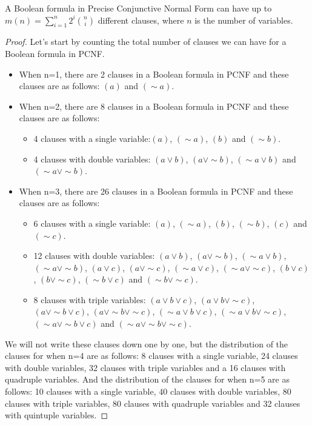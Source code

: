 \documentclass[runningheads,a4paper]{llncs}
\let\oldsim\sim
\renewcommand{\sim}{{\oldsim}}
\begin{document}
\begin{theorem}\normalfont

A Boolean formula in Precise Conjunctive Normal Form can have up to $ m(n) = \sum_{i=1}^{n} 2^{i} \binom{n} {i}$ different clauses, where $n$ is the number of variables.
\begin{proof} Let's start by counting the total number of clauses we can have for a Boolean formula in PCNF.
\begin{itemize}
\item When n=1, there are 2 clauses in a Boolean formula in PCNF and these clauses are as follows: $(a)$ and $(\sim a)$.
 
\item When n=2, there are 8 clauses in a Boolean formula in PCNF and these clauses are as follows:
     \begin{itemize}
    \item 4 clauses with a single variable:$(a)$, $(\sim a)$, $(b)$ and $(\sim b)$.
   \item 4 clauses with double variables: $({a}\vee {b})$, $({a}\vee \sim {b})$, $(\sim {a}\vee {b})$ and $(\sim {a}\vee \sim {b})$.
     \end{itemize}
\item When n=3, there are 26 clauses in a Boolean formula in PCNF and these clauses are as follows:
    \begin{itemize}
    \item 6 clauses with a single variable: $(a)$, $(\sim a)$, $(b)$, $(\sim b)$, $(c)$ and $(\sim c)$.
    \item 12 clauses with double variables: $({a}\vee {b})$, $({a}\vee \sim {b})$, $(\sim {a}\vee {b})$,  $(\sim {a}\vee \sim {b})$, $({a}\vee {c})$, $({a}\vee \sim {c})$, $(\sim {a}\vee {c})$,  $(\sim {a}\vee \sim {c})$, $({b}\vee {c})$, $({b}\vee \sim {c})$, $(\sim {b}\vee {c})$ and $(\sim {b}\vee \sim {c})$.
    \item 8 clauses with triple variables: $({a}\vee {b} \vee {c})$, $({a}\vee {b} \vee \sim {c})$, $({a}\vee \sim {b} \vee {c})$, $({a}\vee \sim {b} \vee \sim {c})$, $(\sim {a}\vee {b} \vee {c})$, $(\sim {a}\vee {b} \vee \sim {c})$, $( \sim {a}\vee \sim {b} \vee {c})$ and $( \sim {a}\vee \sim {b} \vee \sim {c})$.
    \end{itemize}
\end{itemize}

We will not write these clauses down one by one, but the distribution of the clauses for when n=4 are as follows:
8 clauses with a single variable, 24 clauses with double variables, 32 clauses with triple variables and a 16 clauses with quadruple variables. And the distribution of the clauses for when n=5 are as follows: 10 clauses with a single variable, 40 clauses with double variables, 80 clauses with triple variables, 80 clauses with quadruple variables and 32 clauses with quintuple variables. 


\end{proof}
\end{theorem}
\end{document}
